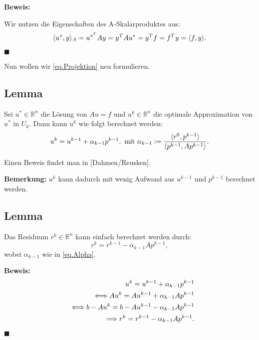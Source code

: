 \textbf{Beweis:}

Wir nutzen die Eigenschaften des A-Skalarproduktes aus:
\begin{equation}
\langle u^{*}, y \rangle _{A} = u^{{*}^{T}}Ay = y^{T}Au^{*} = y^{T}f = f^{T}y = \langle f, y \rangle. \notag
\end{equation}
\begin{flushright}
$\blacksquare$
\end{flushright}

Nun wollen wir \autoref{eq.Projektion} neu formulieren.

\subsection{Lemma}
Sei $u^{*} \in \mathbb{R}^{n}$ die Lösung von $Au = f$ und $u^{k} \in \mathbb{R}^{n}$ die optimale Approximation von $u^{*}$ in $U_{k}$. Dann kann $u^{k}$ wie folgt berechnet werden:
\begin{equation}
u^{k} = u^{k-1} + \alpha_{k-1}p^{k-1}, \textnormal{ mit } \alpha_{k-1} := \frac {\langle r^{0}, p^{k-1} \rangle} {\langle {p^{k-1}, Ap^{k-1}} \rangle}. \notag\label{eq.Alpha}
\end{equation}

Einen Beweis findet man in [Dahmen/Reusken].

\textbf{Bemerkung:}
$u^{k}$ kann dadurch mit wenig Aufwand aus $u^{k-1}$ und $p^{k-1}$ berechnet werden.

\subsection{Lemma}
Das Residuum $r^{k} \in \mathbb{R}^{n}$ kann einfach berechnet werden durch:
\begin{equation}
r^{k} = r^{k-1} - \alpha_{k-1}Ap^{k-1},
\end{equation}
wobei $\alpha_{k-1}$ wie in \autoref{eq.Alpha}.

\textbf{Beweis:}
\begin{eqnarray}
&&u^{k} = u^{k-1} + \alpha_{k-1}p^{k-1} \notag \\
&&\Longleftrightarrow Au^{k} = Au^{k-1} + \alpha_{k-1}Ap^{k-1} \notag \\
&&\Longleftrightarrow b - Au^{k} = b - Au^{k-1} - \alpha_{k-1}Ap^{k-1} \notag \\
&&\Longrightarrow r^{k} = r^{k-1} - \alpha_{k-1}Ap^{k-1}. \notag
\end{eqnarray}
\begin{flushright}
$\blacksquare$
\end{flushright}

